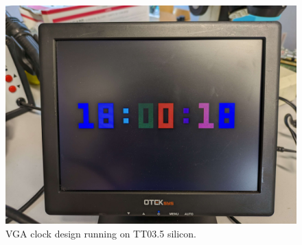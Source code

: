 \begin{figure}[htp]
\centering
\includegraphics[width=\columnwidth]{./Figs/tt3p5 vga clock.jpg}
\caption{VGA clock design running on TT03.5 silicon.}
\label{fig:VGA_clock_design_TT03_5_silicon}
\end{figure}

